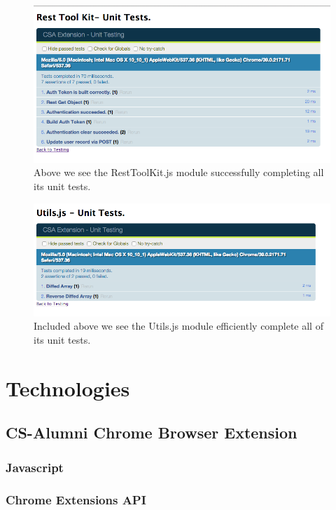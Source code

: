 \documentclass{article}
\begin{document}
\begin{figure}[H]
\centering
\includegraphics[width=\textwidth]{restqunit}
\caption{Above we see the RestToolKit.js module successfully completing all its unit tests.}
\end{figure}

\begin{figure}[H]
\centering
\includegraphics[width=\textwidth]{utilsqunit}
\caption{Included above we see the Utils.js module efficiently complete all of its unit tests.}
\end{figure}

\newpage
\section*{Technologies}

\subsection{CS-Alumni Chrome Browser Extension}

\subsubsection{Javascript}

\subsubsection{Chrome Extensions API}
\end{document}
